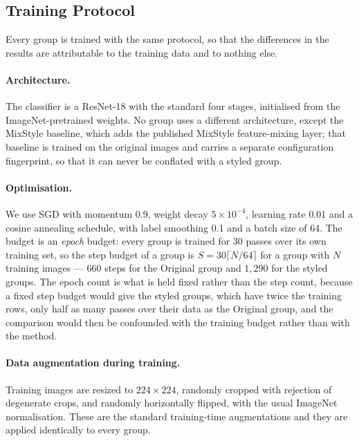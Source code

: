 \subsection{Training Protocol}
\label{sec:training_protocol}

Every group is trained with the same protocol, so that the differences in
the results are attributable to the training data and to nothing else.

\paragraph{Architecture.}
The classifier is a ResNet-18 with the standard four stages, initialised
from the ImageNet-pretrained weights. No group uses a different
architecture, except the MixStyle baseline, which adds the published
MixStyle feature-mixing layer; that baseline is trained on the original
images and carries a separate configuration fingerprint, so that it can
never be conflated with a styled group.

\paragraph{Optimisation.}
We use SGD with momentum 0.9, weight decay $5\times10^{-4}$, learning rate
0.01 and a cosine annealing schedule, with label smoothing 0.1 and a batch
size of 64. The budget is an \emph{epoch} budget: every group is trained for
30 passes over its own training set, so the step budget of a group is
$S = 30\lceil N/64\rceil$ for a group with $N$ training images --- $660$
steps for the Original group and $1{,}290$ for the styled groups. The epoch
count is what is held fixed rather than the step count, because a fixed step
budget would give the styled groups, which have twice the training rows,
only half as many passes over their data as the Original group, and the
comparison would then be confounded with the training budget rather than
with the method.

\paragraph{Data augmentation during training.}
Training images are resized to $224\times224$, randomly cropped with
rejection of degenerate crops, and randomly horizontally flipped, with the
usual ImageNet normalisation. These are the standard training-time
augmentations and they are applied identically to every group.


